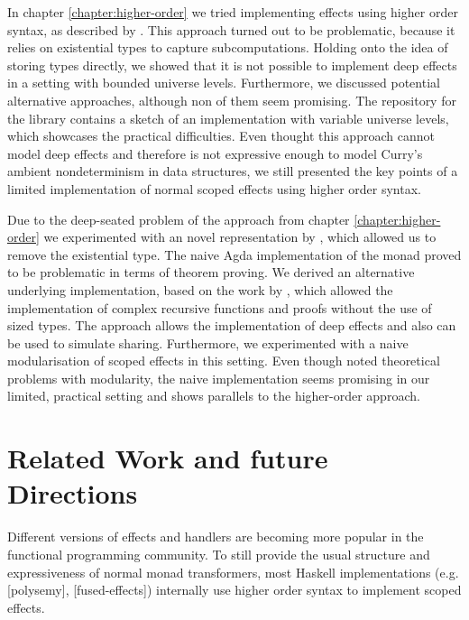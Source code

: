 \documentclass[10pt,a4paper,twoside,notitlepage]{report}
\begin{document}
In chapter \ref{chapter:higher-order} we tried implementing effects using higher
order syntax, as described by \textcite{DBLP:conf/haskell/WuSH14}.
This approach turned out to be problematic, because it relies on existential
types to capture subcomputations.
Holding onto the idea of storing types directly, we showed that it is not
possible to implement deep effects in a setting with bounded universe levels.
Furthermore, we discussed potential alternative approaches, although non of them
seem promising.
The repository for the library contains a sketch of an implementation with
variable universe levels, which showcases the practical difficulties.
Even thought this approach cannot model deep effects and therefore is not
expressive enough to model Curry's ambient nondeterminism in data structures, we
still presented the key points of a limited implementation of normal scoped
effects using higher order syntax.

Due to the deep-seated problem of the approach from chapter
\ref{chapter:higher-order} we experimented with an novel representation by
\textcite{DBLP:conf/lics/PirogSWJ18}, which allowed us to remove the existential
type.
The naive Agda implementation of the monad \textcite{DBLP:conf/lics/PirogSWJ18}
proved to be problematic in terms of theorem proving.
We derived an alternative underlying implementation, based on the work by
\textcite{DBLP:journals/corr/abs-1806-05230}, which allowed the implementation
of complex recursive functions and proofs without the use of sized types.
The approach allows the implementation of deep effects and also can be used to
simulate sharing.
Furthermore, we experimented with a naive modularisation of scoped effects in
this setting.
Even though \textcite{DBLP:conf/lics/PirogSWJ18} noted theoretical problems with
modularity, the naive implementation seems promising in our limited, practical
setting and shows parallels to the higher-order approach. %


\section{Related Work and future Directions}

Different versions of effects and handlers are becoming more popular in the
functional programming community.
To still provide the usual structure and expressiveness of normal monad
transformers, most Haskell implementations (e.g. [polysemy], [fused-effects])
internally use higher order syntax to implement scoped effects.
\end{document}
